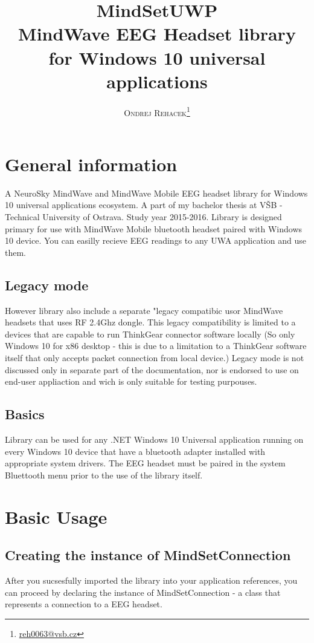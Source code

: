 \documentclass[a4paper,11pt]{book}
\title{\Huge \textbf{MindSetUWP}   \\ \hugeb MindWave EEG Headset library for Windows 10 universal applications}
\author{\textsc{Ondrej Rehacek}\thanks{\url{reh0063@vsb.cz}}}
\begin{document}
\maketitle
\tableofcontents
\mainmatter

\chapter*{General information}
A NeuroSky MindWave and MindWave Mobile EEG headset library for Windows 10 universal applications ecosystem. A part of my bachelor thesis at VŠB - Technical University of Ostrava. Study year 2015-2016. Library is designed primary for use with MindWave Mobile bluetooth headset paired with Windows 10 device. You can easilly recieve EEG readings to any UWA application and use them.

\section*{Legacy mode}
However library also include a separate "legacy compatibic usor MindWave headsets that uses RF 2.4Ghz dongle. This legacy compatibility is limited to a devices that are capable to run ThinkGear connector software locally (So only Windows 10 for x86 desktop - this is due to a limitation to a ThinkGear software itself that only accepts packet connection from local device.) Legacy mode is not discussed only in separate part of the documentation, nor is endorsed to use on end-user appliaction and wich is only suitable for testing purpouses.

\section*{Basics}
Library can be used for any .NET Windows 10 Universal application running on every Windows 10 device that have a bluetooth adapter installed with appropriate system drivers. The EEG headset must be paired in the system Bluettooth menu prior to the use of the library itself.


\chapter{Basic Usage}

\section{Creating the instance of MindSetConnection}
After you sucsesfully imported the library into your application references, you can proceed by declaring the instance of MindSetConnection - a class that represents a connection to a EEG headset. 
\end{document}
